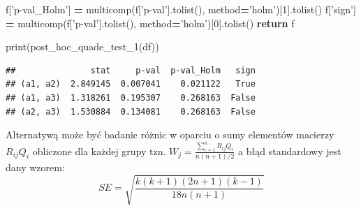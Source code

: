\documentclass[polish,]{book}
\newenvironment{Shaded}{\begin{snugshade}}{\end{snugshade}}
\newcommand{\BuiltInTok}[1]{#1}
\newcommand{\ControlFlowTok}[1]{\textcolor[rgb]{0.13,0.29,0.53}{\textbf{#1}}}
\newcommand{\DecValTok}[1]{\textcolor[rgb]{0.00,0.00,0.81}{#1}}
\newcommand{\NormalTok}[1]{#1}
\newcommand{\OperatorTok}[1]{\textcolor[rgb]{0.81,0.36,0.00}{\textbf{#1}}}
\newcommand{\StringTok}[1]{\textcolor[rgb]{0.31,0.60,0.02}{#1}}
\begin{document}
\begin{Shaded}
\begin{Highlighting}[]
\NormalTok{    f[}\StringTok{'p-val_Holm'}\NormalTok{] }\OperatorTok{=}\NormalTok{ multicomp(f[}\StringTok{'p-val'}\NormalTok{].tolist(), method}\OperatorTok{=}\StringTok{'holm'}\NormalTok{)[}\DecValTok{1}\NormalTok{].tolist()}
\NormalTok{    f[}\StringTok{'sign'}\NormalTok{] }\OperatorTok{=}\NormalTok{ multicomp(f[}\StringTok{'p-val'}\NormalTok{].tolist(), method}\OperatorTok{=}\StringTok{'holm'}\NormalTok{)[}\DecValTok{0}\NormalTok{].tolist()}
    \ControlFlowTok{return}\NormalTok{ f}
    
\BuiltInTok{print}\NormalTok{(post_hoc_quade_test_1(df))}
\end{Highlighting}
\end{Shaded}

\begin{verbatim}
##               stat     p-val  p-val_Holm   sign
## (a1, a2)  2.849145  0.007041    0.021122   True
## (a1, a3)  1.318261  0.195307    0.268163  False
## (a2, a3)  1.530884  0.134081    0.268163  False
\end{verbatim}

Alternatywą może być badanie różnic w oparciu o sumy elementów macierzy \(R_{ij}Q_i\) obliczone dla każdej grupy tzn. \(W_j=\frac{\sum_{i=1}^{n}R_{ij}Q_i}{n(n+1)/2}\) a błąd standardowy jest dany wzorem:
\begin{equation}
SE=\sqrt{\frac{k(k+1)(2n+1)(k-1)}{18n(n+1)}}
\label{eq:dep011}
\end{equation}
\end{document}
